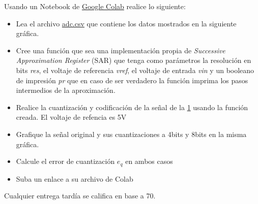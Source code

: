 \documentclass[12pt]{article}
\begin{document}
\setlength{\parindent}{0em}

Usando un Notebook de \href{https://colab.research.google.com/}{Google Colab} realice lo siguiente:

\begin{itemize}
    \item Lea el archivo \href{https://estudianteccr-my.sharepoint.com/:u:/g/personal/prof_juan_rojas_estudiantec_cr/EcuXJs2cG21HnH02L5fq5OMBOoznw5P7fMkWscsfJdJjgQ?e=8s1NAe}{adc.csv} que contiene los datos mostrados en la siguiente gráfica.
    \begin{figure}[H]
        \centering
        \caption{}
        \label{fig:signal}
    \end{figure}
    \item Cree una función que sea una implementación propia de \emph{Successive Approximation Register} (SAR) que tenga como parámetros la resolución en bits \emph{res}, el voltaje de referencia \emph{vref}, el voltaje de entrada \emph{vin} y un booleano de impresión \emph{pr} que en caso de ser verdadero la función imprima los pasos intermedios de la aproximación.
    \item Realice la cuantización y codificación de la señal de la \ref{fig:signal} usando la función creada. El voltaje de refencia es 5\si{V}
    \item Grafique la señal original y sus cuantizaciones a 4bits y 8bits en la misma gráfica.
    \item Calcule el error de cuantización $e_q$ en ambos casos
    \item Suba un enlace a su archivo de Colab
\end{itemize}

Cualquier entrega tardía se califica en base a 70. 

% 
% 
\end{document}
